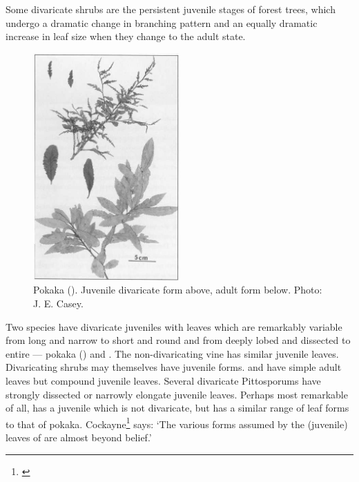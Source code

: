 Some divaricate shrubs are the persistent juvenile stages of forest trees, which undergo a dramatic change in branching pattern and an equally dramatic increase in leaf size when they change to the adult state.

\begin{figure}
	\includegraphics[width=0.5\textwidth]{graphics/figure78pokaka.jpg}
	\centering
	\caption[Pokaka]{Pokaka ().
    Juvenile divaricate form above, adult form below.
    Photo:  J. E. Casey.}
	\label{fig:78pokaka}
\end{figure}

Two species have divaricate juveniles with leaves which are remarkably variable from long and narrow to short and round and from deeply lobed and dissected to entire — pokaka () and .
The non-divaricating vine  has similar juvenile leaves.
Divaricating shrubs may themselves have juvenile forms.  and  have simple adult leaves but compound juvenile leaves.
Several divaricate Pittosporums have strongly dissected or narrowly elongate juvenile leaves.
Perhaps most remarkable of all,  has a juvenile which is not divaricate, but has a similar range of leaf forms to that of pokaka.
Cockayne\footnote{\cite{cockayne1899enquiry}} says: `The various forms assumed by the (juvenile) leaves of  are almost beyond belief.'

